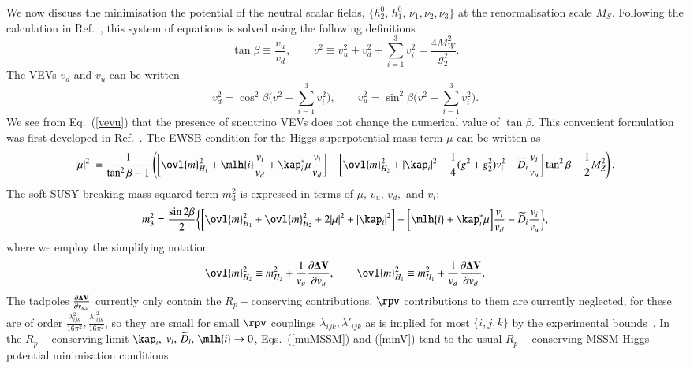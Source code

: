 \documentclass[final,3p,times,pdflatex]{elsarticle}
\begin{document}
We now discuss the minimisation the potential of the neutral
scalar fields, $\{ h_2^0,\,h_1^0,\,{\tilde
  \nu}_1, {\tilde
  \nu}_2, {\tilde
  \nu}_3  \}$ at the renormalisation scale
$M_{S}$. Following the
calculation in 
Ref.~\cite{Allanach:2003eb}, this system of equations is solved using the
following definitions \cite{Nowakowski:1995dx} 
\begin{equation}
\tan\beta  \equiv  \frac{v_u}{v_d}, \qquad
v^2 \equiv v_u^2+v_d^2+\sum_{i=1}^3 v_i^2 = \frac{4 M_W^2}{g_2^2}.
\label{vevtotal}
\end{equation}
The VEVs $v_d$ and $v_u$ can be written 
\begin{equation}
v_d^2 =  \cos^2\beta \biggl (v^2-\sum_{i=1}^3 v_i^2 \biggr ), \qquad
v_u^2 =  \sin^2\beta \biggl (v^2-\sum_{i=1}^3 v_i^2 \biggr ).
\label{vevu} 
\end{equation}
We see from Eq.~(\ref{vevu}) that the presence of sneutrino VEVs does not change
the numerical value of 
$\tan \beta$. This convenient formulation was
first developed in Ref.~\cite{Nowakowski:1995dx}. 
The EWSB condition for the Higgs superpotential mass term $\mu$ can be written
\cite{Allanach:2003eb} as
 \begin{equation}
 |\mu|^2 \ = \frac{1}{\tan^2\beta -1} \left(
 \biggl [  \ovl{m}_{H_1}^2 + \mlh{i} \frac{v_i}{v_d} 
 +\kap_i^* \mu \frac{v_i}{v_d} \biggr ]
 - 
 \biggl [ \ovl{m}_{H_2}^2
 +|\kap_i|^2 - \frac{1}{4} (g^2+g_2^2) v_i^2 - \widetilde{D}_i
 \frac{v_i}{v_u} \biggr ] \tan^2\beta
 - \frac{1}{2}
 M_Z^2 \right), \label{muMSSM}
 \end{equation}
The soft SUSY breaking mass squared term ${m_3^2}$ is expressed in terms of
$\mu,\,v_u,\,v_d,$ and $v_i$: 
\begin{equation}
m_3^2 = \frac{\sin2\beta}{2} \biggl \{\biggl [ \ovl{m}_{H_1}^2
+\ovl{m}_{H_2}^2 + 2 |\mu|^2 +|\kap_i|^2 \biggr ]+ \biggl
[ \mlh{i}+\kap_i^*\mu \biggr ]\frac{v_i}{v_d} -\widetilde{D}_i
\frac{v_i}{v_u}
\biggr \} , \label{minV}
\end{equation}
where we employ the 
simplifying notation
\begin{equation}
\ovl{m}_{H_2}^2 \equiv  m_{H_2}^2 +\frac{1}{v_u} 
\frac{\partial {\bf \Delta V}}{\partial v_u}, \qquad
\ovl{m}_{H_1}^2 \equiv  m_{H_1}^2 +\frac{1}{v_d} 
\frac{\partial {\bf \Delta V}}{\partial v_d}.
\end{equation}
The tadpoles $\frac{\partial {\bf \Delta V}}{\partial v_{u,d}}$ currently
only contain the $R_p-$conserving contributions.  
$\rpv$ contributions to them are currently neglected, for these are of order
$\frac{\lambda^2_{ijk}}{16\pi^2}, \frac{{\lambda'}_{ijk}^2}{16\pi^2}$, so they are small
for small $\rpv$ couplings $\lambda_{ijk},\lambda'_{ijk}$ as is implied for
most $\{ i,j,k \}$ 
by the experimental bounds~\cite{Barbier:2004ez}. 
In the $R_p-$conserving limit $\kap_i,$ $v_i,\,\widetilde{D}_i,\,\mlh{i} \to
0$, Eqs.~(\ref{muMSSM}) and (\ref{minV}) tend to the usual $R_p-$conserving
MSSM Higgs 
potential minimisation conditions. 
\end{document}
